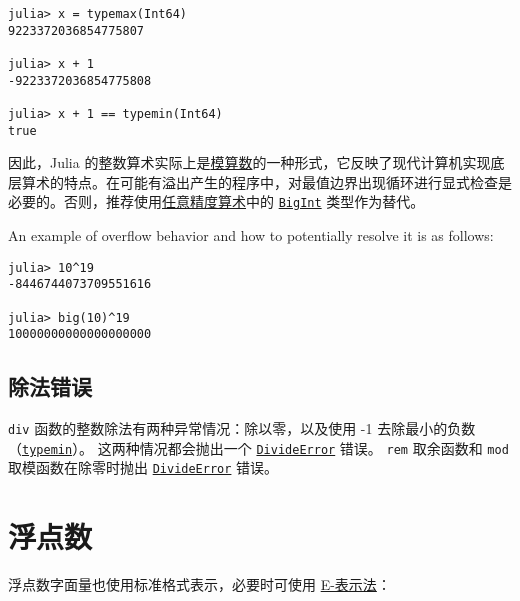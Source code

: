 \begin{verbatim}
julia> x = typemax(Int64)
9223372036854775807

julia> x + 1
-9223372036854775808

julia> x + 1 == typemin(Int64)
true
\end{verbatim}



因此，Julia 的整数算术实际上是\href{https://zh.wikipedia.org/wiki/\%E6\%A8\%A1\%E7\%AE\%97\%E6\%95\%B8}{模算数}的一种形式，它反映了现代计算机实现底层算术的特点。在可能有溢出产生的程序中，对最值边界出现循环进行显式检查是必要的。否则，推荐使用\hyperlink{7537478913062818871}{任意精度算术}中的 \hyperlink{423405808990690832}{\texttt{BigInt}} 类型作为替代。



An example of overflow behavior and how to potentially resolve it is as follows:




\begin{verbatim}
julia> 10^19
-8446744073709551616

julia> big(10)^19
10000000000000000000
\end{verbatim}



\hypertarget{18099425100953658872}{}


\subsection{除法错误}



\texttt{div} 函数的整数除法有两种异常情况：除以零，以及使用 -1 去除最小的负数（\hyperlink{3613894539247233488}{\texttt{typemin}}）。 这两种情况都会抛出一个 \hyperlink{4168463413201806292}{\texttt{DivideError}} 错误。 \texttt{rem} 取余函数和 \texttt{mod} 取模函数在除零时抛出 \hyperlink{4168463413201806292}{\texttt{DivideError}} 错误。



\hypertarget{7313324545649063110}{}


\section{浮点数}



浮点数字面量也使用标准格式表示，必要时可使用 \href{https://en.wikipedia.org/wiki/Scientific\_notation\#E-notation}{E-表示法}：




